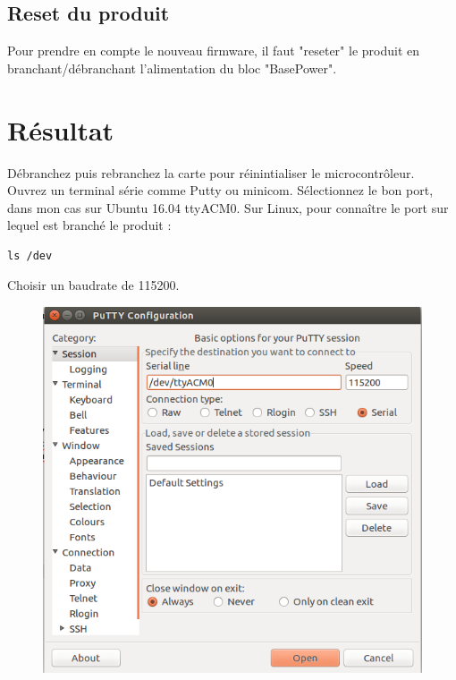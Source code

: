 \documentclass{article}
\begin{document}
\subsection{Reset du produit}
Pour prendre en compte le nouveau firmware, il faut "reseter" le produit en branchant/débranchant l'alimentation du bloc "BasePower".




\section{Résultat}

Débranchez puis rebranchez la carte pour réinintialiser le microcontrôleur.\\
Ouvrez un terminal série comme Putty ou minicom.
Sélectionnez le bon port, dans mon cas sur Ubuntu 16.04 ttyACM0.
Sur Linux, pour connaître le port sur lequel est branché le produit :

\begin{verbatim}
ls /dev

\end{verbatim}

Choisir un baudrate de 115200.


\begin{figure}[H]
\begin{center}
\advance\leftskip-3cm
\advance\rightskip-3cm
\includegraphics[keepaspectratio=true,scale=0.5]{putty.png}

\label{visina8}
\end{center}\end{figure}
\end{document}
